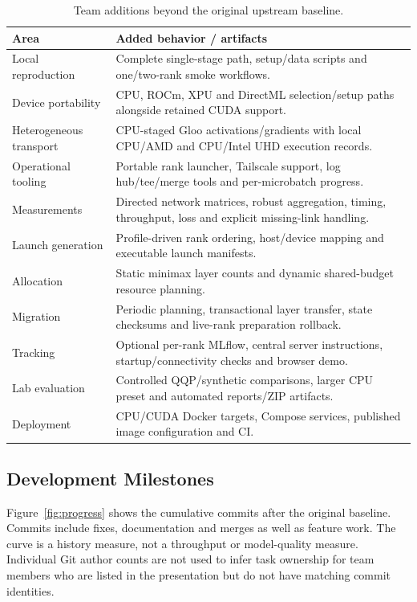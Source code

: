 \begin{table}[H]
\centering\small
\caption{Team additions beyond the original upstream baseline.}
\begin{tabularx}{\textwidth}{P{2.5cm}Y}
\toprule
\textbf{Area} & \textbf{Added behavior / artifacts}\\
\midrule
Local reproduction & Complete single-stage path, setup/data scripts and one/two-rank smoke workflows.\\
Device portability & CPU, ROCm, XPU and DirectML selection/setup paths alongside retained CUDA support.\\
Heterogeneous transport & CPU-staged Gloo activations/gradients with local CPU/AMD and CPU/Intel UHD execution records.\\
Operational tooling & Portable rank launcher, Tailscale support, log hub/tee/merge tools and per-microbatch progress.\\
Measurements & Directed network matrices, robust aggregation, timing, throughput, loss and explicit missing-link handling.\\
Launch generation & Profile-driven rank ordering, host/device mapping and executable launch manifests.\\
Allocation & Static minimax layer counts and dynamic shared-budget resource planning.\\
Migration & Periodic planning, transactional layer transfer, state checksums and live-rank preparation rollback.\\
Tracking & Optional per-rank MLflow, central server instructions, startup/connectivity checks and browser demo.\\
Lab evaluation & Controlled QQP/synthetic comparisons, larger CPU preset and automated reports/ZIP artifacts.\\
Deployment & CPU/CUDA Docker targets, Compose services, published image configuration and CI.\\
\bottomrule
\end{tabularx}
\end{table}

\subsection{Development Milestones}

Figure~\ref{fig:progress} shows the cumulative commits after the original baseline. Commits include fixes, documentation and merges as well as feature work. The curve is a history measure, not a throughput or model-quality measure. Individual Git author counts are not used to infer task ownership for team members who are listed in the presentation but do not have matching commit identities.

